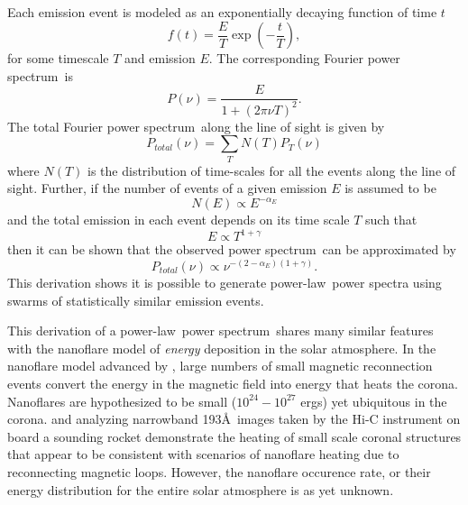 \documentclass[onecolumn]{emulateapj}
\newcommand{\PS}{power spectrum}
\newcommand{\PL}{power-law}
\newcommand{\Fps}{Fourier \PS}
\begin{document}
Each emission event is modeled as an exponentially decaying function
of time $t$
\begin{equation}
\label{eqn:expdecay}
f(t) = \frac{E}{T}\exp\left(-\frac{t}{T}\right),
\end{equation}
for some timescale $T$ and emission $E$.  The corresponding \Fps\ is
\begin{equation}
\label{eqn:ftexpdecay}
P(\nu) = \frac{E}{1 + (2\pi \nu T)^{2}}.
\end{equation}
The total \Fps\ along the line of sight is given by
\begin{equation}
\label{eqn:sumftexpdecay}
P_{total}(\nu) = \sum_{T}N(T)P_{T}(\nu)
\end{equation}
where $N(T)$ is the distribution of time-scales for all the events
along the line of sight.  Further, if the number of events of a given
emission $E$ is assumed to be
\begin{equation}
\label{eqn:energydistrib}
N(E) \propto E^{-\alpha_{E}}
\end{equation}
and the total emission in each event depends on its time scale $T$
such that
\begin{equation}
\label{eqn:energytime}
E \propto T^{1+\gamma}
\end{equation}
then it can be shown that the observed \PS\ can be
approximated by
\begin{equation}
\label{eqn:finalfps}
P_{total}(\nu) \propto \nu^{-(2-\alpha_{E})(1+\gamma)}.
\end{equation}
This derivation shows it is possible to generate \PL\ power spectra
using swarms of statistically similar emission events.  

This derivation of a \PL\ \PS\ shares many similar features with the
nanoflare model of {\it energy} deposition in the solar atmosphere. In
the nanoflare model advanced by \cite{1988ApJ...330..474P}, large
numbers of small magnetic reconnection events convert the energy in
the magnetic field into energy that heats the corona.  Nanoflares are
hypothesized to be small ($10^{24}-10^{27}$ ergs) yet ubiquitous in
the corona.  \cite{2013ApJ...771...21W} and \cite{2013ApJ...770L...1T}
analyzing narrowband 193\AA\ images taken by the Hi-C instrument on
board a sounding rocket demonstrate the heating of small scale coronal
structures that appear to be consistent with scenarios of nanoflare
heating due to reconnecting magnetic loops.  However, the nanoflare
occurence rate, or their energy distribution for the entire solar
atmosphere is as yet unknown.
\end{document}
